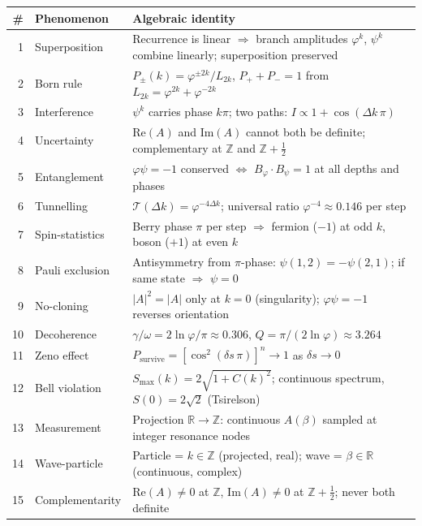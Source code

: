 \documentclass[12pt,a4paper]{article}
\begin{document}
\begin{center}\small
\begin{tabular}{|r|p{3.0cm}|p{7.8cm}|}
\hline
\# & \textbf{Phenomenon} & \textbf{Algebraic identity} \\
\hline
1 & Superposition & Recurrence is linear $\Rightarrow$ branch amplitudes $\varphi^k$, $\psi^k$ combine linearly; superposition preserved \\
2 & Born rule & $P_\pm(k) = \varphi^{\pm 2k}/L_{2k}$, $P_+ + P_- = 1$ from $L_{2k} = \varphi^{2k} + \varphi^{-2k}$ \\
3 & Interference & $\psi^k$ carries phase $k\pi$; two paths: $I \propto 1 + \cos(\Delta k\,\pi)$ \\
4 & Uncertainty & $\mathrm{Re}(A)$ and $\mathrm{Im}(A)$ cannot both be definite; complementary at $\mathbb{Z}$ and $\mathbb{Z}+\frac{1}{2}$ \\
5 & Entanglement & $\varphi\psi = -1$ conserved $\Leftrightarrow$ $B_\varphi \cdot B_\psi = 1$ at all depths and phases \\
6 & Tunnelling & $\mathcal{T}(\Delta k) = \varphi^{-4\Delta k}$; universal ratio $\varphi^{-4} \approx 0.146$ per step \\
7 & Spin-statistics & Berry phase $\pi$ per step $\Rightarrow$ fermion ($-1$) at odd $k$, boson ($+1$) at even $k$ \\
8 & Pauli exclusion & Antisymmetry from $\pi$-phase: $\psi(1,2) = -\psi(2,1)$; if same state $\Rightarrow$ $\psi = 0$ \\
9 & No-cloning & $|A|^2 = |A|$ only at $k = 0$ (singularity); $\varphi\psi = -1$ reverses orientation \\
10 & Decoherence & $\gamma/\omega = 2\ln\varphi/\pi \approx 0.306$, $Q = \pi/(2\ln\varphi) \approx 3.264$ \\
11 & Zeno effect & $P_{\mathrm{survive}} = [\cos^2(\delta s\,\pi)]^n \to 1$ as $\delta s \to 0$ \\
12 & Bell violation & $S_{\max}(k) = 2\sqrt{1+C(k)^2}$; continuous spectrum, $S(0)=2\sqrt{2}$ (Tsirelson) \\
13 & Measurement & Projection $\mathbb{R} \to \mathbb{Z}$: continuous $A(\beta)$ sampled at integer resonance nodes \\
14 & Wave-particle & Particle = $k \in \mathbb{Z}$ (projected, real); wave = $\beta \in \mathbb{R}$ (continuous, complex) \\
15 & Complementarity & $\mathrm{Re}(A) \neq 0$ at $\mathbb{Z}$, $\mathrm{Im}(A) \neq 0$ at $\mathbb{Z}+\frac{1}{2}$; never both definite \\

\end{tabular}
\end{center}
\end{document}

